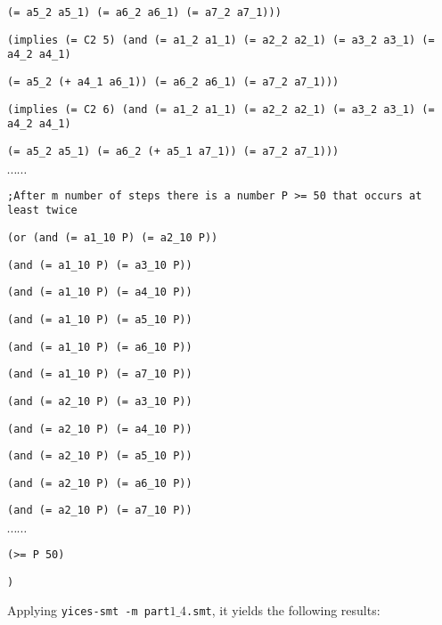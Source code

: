 {{\tt (= a5\_2 a5\_1) (= a6\_2 a6\_1) (= a7\_2 a7\_1)))}

{\tt (implies (= C2 5)  (and (= a1\_2 a1\_1) (= a2\_2 a2\_1) (= a3\_2 a3\_1) (= a4\_2 a4\_1)}

{\tt (= a5\_2 (+ a4\_1 a6\_1)) (= a6\_2 a6\_1) (= a7\_2 a7\_1)))}

{\tt (implies (= C2 6)  (and (= a1\_2 a1\_1) (= a2\_2 a2\_1) (= a3\_2 a3\_1) (= a4\_2 a4\_1)}

{\tt (= a5\_2 a5\_1) (= a6\_2 (+ a5\_1 a7\_1)) (= a7\_2 a7\_1)))}

$\cdots \cdots$

{\tt ;After m number of steps there is a number P >= 50 that occurs at least twice }

{\tt  (or  (and (= a1\_10 P) (= a2\_10 P))}

{\tt (and (= a1\_10 P) (= a3\_10 P))}

 {\tt (and (= a1\_10 P) (= a4\_10 P))}

 {\tt (and (= a1\_10 P) (= a5\_10 P))}

 {\tt (and (= a1\_10 P) (= a6\_10 P))}

 {\tt (and (= a1\_10 P) (= a7\_10 P))}

 {\tt (and (= a2\_10 P) (= a3\_10 P))}

 {\tt (and (= a2\_10 P) (= a4\_10 P))}

 {\tt (and (= a2\_10 P) (= a5\_10 P))}

 {\tt (and (= a2\_10 P) (= a6\_10 P))}

 {\tt (and (= a2\_10 P) (= a7\_10 P))}

$\cdots \cdots$

{\tt (>= P 50)}

{\tt )}
}

\vspace{3mm}

Applying {\tt yices-smt -m part$1\_4$.smt}, it yields the following results:

